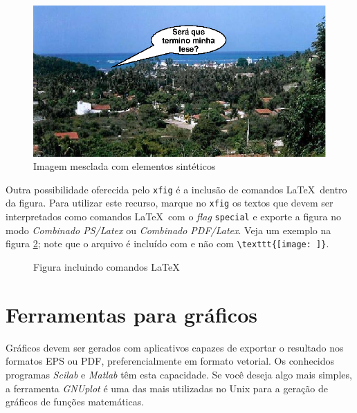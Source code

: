 \begin{figure}[htb] \begin{center}
\includegraphics{./figuras/pensador}
\caption{Imagem mesclada com elementos sintéticos}
\label{Fig:pensador}
\end{center} \end{figure}

Outra possibilidade oferecida pelo \texttt{xfig} é a inclusão de comandos
\LaTeX\ dentro da figura. Para utilizar este recurso,
marque no \texttt{xfig} os textos que devem ser interpretados como
comandos \LaTeX\ com o \emph{flag} \texttt{special} e exporte a figura
no modo \emph{Combinado PS/Latex} ou \emph{Combinado PDF/Latex}. Veja
um exemplo na figura \ref{Fig:combinado}; note que o arquivo é incluído com
\verb|| e não com \verb|\texttt{[image: ]}|.

\newcommand{\formulagrande}{$\frac{G_3G_4}{1-G_3G_4H_1}$}
\begin{figure}[htb] \begin{center}
\caption{Figura incluindo comandos \LaTeX}
\label{Fig:combinado}
\end{center} \end{figure}

\section{Ferramentas para gráficos}
\label{Sec:graficos}

Gráficos devem ser gerados com aplicativos capazes de exportar o
resultado nos formatos EPS ou PDF, preferencialmente em formato
vetorial. Os conhecidos programas \emph{Scilab} e \emph{Matlab} têm
esta capacidade. Se você deseja algo mais simples, a ferramenta
\textit{GNUplot} é uma das mais utilizadas no Unix para a geração de
gráficos de funções matemáticas.

